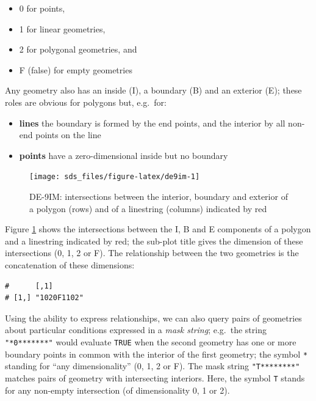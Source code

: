 \documentclass[]{book}
\providecommand{\tightlist}{%
  \setlength{\itemsep}{0pt}\setlength{\parskip}{0pt}}
\begin{document}
\begin{itemize}
\tightlist
\item
  0 for points,
\item
  1 for linear geometries,
\item
  2 for polygonal geometries, and
\item
  F (false) for empty geometries
\end{itemize}

Any geometry also has an inside (I), a boundary (B) and an exterior (E); these
roles are obvious for polygons but, e.g.~for:

\begin{itemize}
\tightlist
\item
  \textbf{lines} the boundary is formed by the end points, and the interior
  by all non-end points on the line
\item
  \textbf{points} have a zero-dimensional inside but no boundary
\end{itemize}

\begin{figure}

{\centering \texttt{[image: sds\_files/figure-latex/de9im-1]} 

}

\caption{DE-9IM: intersections between the interior, boundary and exterior of a polygon (rows) and of a linestring (columns) indicated by red}\label{fig:de9im}
\end{figure}

Figure \ref{fig:de9im} shows the intersections between the I,
B and E components of a polygon and a linestring indicated by red;
the sub-plot title gives the dimension of these intersections (0,
1, 2 or F). The relationship between the two geometries is the
concatenation of these dimensions:

\begin{verbatim}
#      [,1]       
# [1,] "1020F1102"
\end{verbatim}

Using the ability to express relationships, we can also query
pairs of geometries about particular conditions expressed in a
\emph{mask string}; e.g.~the string \texttt{"*0*******"} would evaluate \texttt{TRUE}
when the second geometry has one or more boundary points in common
with the interior of the first geometry; the symbol \texttt{*} standing for
``any dimensionality'' (0, 1, 2 or F). The mask string \texttt{"T********"}
matches pairs of geometry with intersecting interiors. Here, the
symbol \texttt{T} stands for any non-empty intersection (of dimensionality
0, 1 or 2).
\end{document}

